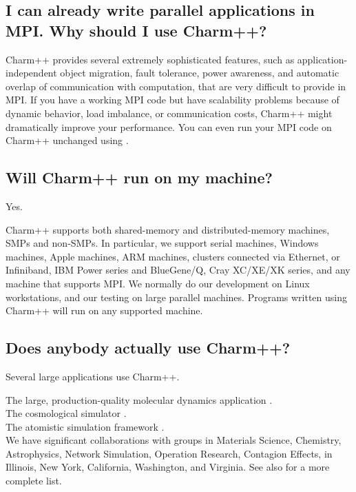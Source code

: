 \subsection{I can already write parallel applications in MPI. Why should I use Charm++?}

Charm++ provides several extremely sophisticated features, such as
application-independent object migration, fault tolerance, power
awareness, and automatic overlap of communication with computation,
that are very difficult to provide in MPI.  If you have a working MPI
code but have scalability problems because of dynamic behavior, load
imbalance, or communication costs, Charm++ might dramatically improve
your performance. You can even run your MPI code on Charm++ unchanged
using
.

\subsection{Will Charm++ run on my machine?}

Yes.

Charm++ supports both shared-memory and distributed-memory machines,
SMPs and non-SMPs. In particular, we support serial machines, Windows
machines, Apple machines, ARM machines, clusters connected via
Ethernet, or Infiniband, IBM Power series and BlueGene/Q, Cray
XC/XE/XK series, and any machine that supports MPI. We normally do our
development on Linux workstations, and our testing on large parallel
machines. Programs written using Charm++ will run on any supported
machine.

\subsection{Does anybody actually use Charm++?}

Several large applications use Charm++.

The large, production-quality molecular dynamics application .  \\
The cosmological simulator  . \\
The atomistic simulation framework . \\

We have significant collaborations with groups in Materials Science,
Chemistry, Astrophysics, Network Simulation, Operation Research, Contagion Effects, in Illinois, New York, California, Washington, and Virginia. See also  for a more complete list.

